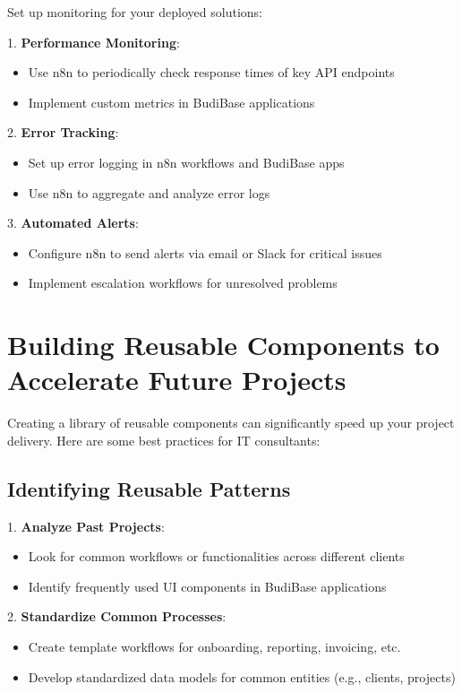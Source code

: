 Set up monitoring for your deployed solutions:

1. \textbf{Performance Monitoring}:
\begin{itemize}
    \item Use n8n to periodically check response times of key API endpoints
    \item Implement custom metrics in BudiBase applications
\end{itemize}

2. \textbf{Error Tracking}:
\begin{itemize}
    \item Set up error logging in n8n workflows and BudiBase apps
    \item Use n8n to aggregate and analyze error logs
\end{itemize}

3. \textbf{Automated Alerts}:
\begin{itemize}
    \item Configure n8n to send alerts via email or Slack for critical issues
    \item Implement escalation workflows for unresolved problems
\end{itemize}


\section{Building Reusable Components to Accelerate Future Projects}

Creating a library of reusable components can significantly speed up your project delivery. Here are some best practices for IT consultants:

\subsection{Identifying Reusable Patterns}

1. \textbf{Analyze Past Projects}:
\begin{itemize}
    \item Look for common workflows or functionalities across different clients
    \item Identify frequently used UI components in BudiBase applications
\end{itemize}

2. \textbf{Standardize Common Processes}:
\begin{itemize}
    \item Create template workflows for onboarding, reporting, invoicing, etc.
    \item Develop standardized data models for common entities (e.g., clients, projects)
\end{itemize}

